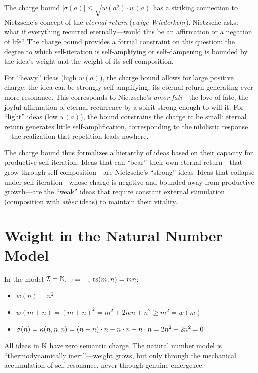 \begin{interpretation}\label{interp:ch3:charge_bound_nietzsche}
The charge bound $|\sigma(a)| \leq \sqrt{w(a^2) \cdot w(a)}$ has a
striking connection to Nietzsche's concept of the \emph{eternal return}
(\emph{ewige Wiederkehr}). Nietzsche asks: what if everything recurred
eternally---would this be an affirmation or a negation of life? The charge
bound provides a formal constraint on this question: the degree to which
self-iteration is self-amplifying or self-dampening is bounded by the
idea's weight and the weight of its self-composition.

For ``heavy'' ideas (high $w(a)$), the charge bound allows for large
positive charge: the idea can be strongly self-amplifying, its eternal
return generating ever more resonance. This corresponds to Nietzsche's
\emph{amor fati}---the love of fate, the joyful affirmation of eternal
recurrence by a spirit strong enough to will it. For ``light'' ideas
(low $w(a)$), the bound constrains the charge to be small: eternal
return generates little self-amplification, corresponding to the
nihilistic response---the realization that repetition leads nowhere.

The charge bound thus formalizes a hierarchy of ideas based on their
capacity for productive self-iteration. Ideas that can ``bear'' their
own eternal return---that grow through self-composition---are Nietzsche's
``strong'' ideas. Ideas that collapse under self-iteration---whose
charge is negative and bounded away from productive growth---are the
``weak'' ideas that require constant external stimulation (composition
with \emph{other} ideas) to maintain their vitality.
\end{interpretation}

\section{Weight in the Natural Number Model}

\begin{example}
In the model $\mathcal{I} = \mathbb{N}$, $\circ = +$, $\mathrm{rs}(m,n) = mn$:
\begin{itemize}
    \item $w(n) = n^2$
    \item $w(m + n) = (m+n)^2 = m^2 + 2mn + n^2 \geq m^2 = w(m)$ \checkmark
    \item $\sigma(n) = \kappa(n,n,n) = (n+n) \cdot n - n \cdot n - n \cdot n
          = 2n^2 - 2n^2 = 0$
\end{itemize}
All ideas in $\mathbb{N}$ have zero semantic charge. The natural number model is
``thermodynamically inert''---weight grows, but only through the mechanical
accumulation of self-resonance, never through genuine emergence.
\end{example}

